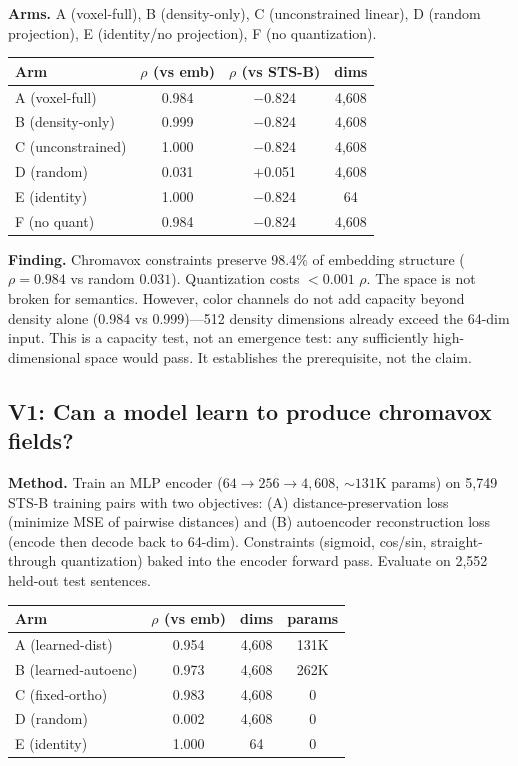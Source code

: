 \documentclass[11pt,a4paper]{article}
\begin{document}
\textbf{Arms.} A (voxel-full), B (density-only), C (unconstrained linear), D (random projection), E (identity/no projection), F (no quantization).

\begin{table}[h]
\centering
\begin{tabular}{lccc}
\toprule
Arm & $\rho$ (vs emb) & $\rho$ (vs STS-B) & dims \\
\midrule
A (voxel-full) & 0.984 & $-$0.824 & 4,608 \\
B (density-only) & 0.999 & $-$0.824 & 4,608 \\
C (unconstrained) & 1.000 & $-$0.824 & 4,608 \\
D (random) & 0.031 & $+$0.051 & 4,608 \\
E (identity) & 1.000 & $-$0.824 & 64 \\
F (no quant) & 0.984 & $-$0.824 & 4,608 \\
\bottomrule
\end{tabular}
\end{table}

\textbf{Finding.} Chromavox constraints preserve 98.4\% of embedding structure ($\rho{=}0.984$ vs random $0.031$). Quantization costs $<0.001$ $\rho$. The space is not broken for semantics. However, color channels do not add capacity beyond density alone (0.984 vs 0.999)---512 density dimensions already exceed the 64-dim input. This is a capacity test, not an emergence test: any sufficiently high-dimensional space would pass. It establishes the prerequisite, not the claim.

\subsection{V1: Can a model learn to produce chromavox fields?}

\textbf{Method.} Train an MLP encoder ($64 \to 256 \to 4{,}608$, ${\sim}131$K params) on 5,749 STS-B training pairs with two objectives: (A) distance-preservation loss (minimize MSE of pairwise distances) and (B) autoencoder reconstruction loss (encode then decode back to 64-dim). Constraints (sigmoid, cos/sin, straight-through quantization) baked into the encoder forward pass. Evaluate on 2,552 held-out test sentences.

\begin{table}[h]
\centering
\begin{tabular}{lccc}
\toprule
Arm & $\rho$ (vs emb) & dims & params \\
\midrule
A (learned-dist) & 0.954 & 4,608 & 131K \\
B (learned-autoenc) & 0.973 & 4,608 & 262K \\
C (fixed-ortho) & 0.983 & 4,608 & 0 \\
D (random) & 0.002 & 4,608 & 0 \\
E (identity) & 1.000 & 64 & 0 \\
\bottomrule
\end{tabular}
\end{table}
\end{document}

